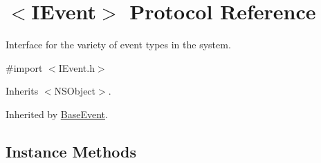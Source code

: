 \hypertarget{protocol_i_event-p}{}\section{$<$I\+Event$>$ Protocol Reference}
\label{protocol_i_event-p}


Interface for the variety of event types in the system.  




{\ttfamily \#import $<$I\+Event.\+h$>$}



Inherits $<$\+N\+S\+Object$>$.



Inherited by \hyperlink{interface_base_event}{Base\+Event}.

\subsection*{Instance Methods}
